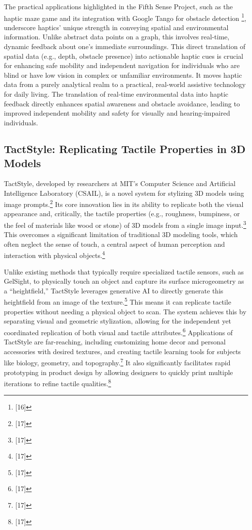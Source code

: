 The practical applications highlighted in the Fifth Sense Project, such as the haptic maze game and its integration with Google Tango for obstacle detection \footnote{[16]}, underscore haptics' unique strength in conveying spatial and environmental information. Unlike abstract data points on a graph, this involves real-time, dynamic feedback about one's immediate surroundings. This direct translation of spatial data (e.g., depth, obstacle presence) into actionable haptic cues is crucial for enhancing safe mobility and independent navigation for individuals who are blind or have low vision in complex or unfamiliar environments. It moves haptic data from a purely analytical realm to a practical, real-world assistive technology for daily living. The translation of real-time environmental data into haptic feedback directly enhances spatial awareness and obstacle avoidance, leading to improved independent mobility and safety for visually and hearing-impaired individuals.

\subsection{TactStyle: Replicating Tactile Properties in 3D Models}
TactStyle, developed by researchers at MIT’s Computer Science and Artificial Intelligence Laboratory (CSAIL), is a novel system for stylizing 3D models using image prompts.\footnote{[17]} Its core innovation lies in its ability to replicate both the visual appearance and, critically, the tactile properties (e.g., roughness, bumpiness, or the feel of materials like wood or stone) of 3D models from a single image input.\footnote{[17]} This overcomes a significant limitation of traditional 3D modeling tools, which often neglect the sense of touch, a central aspect of human perception and interaction with physical objects.\footnote{[17]}

Unlike existing methods that typically require specialized tactile sensors, such as GelSight, to physically touch an object and capture its surface microgeometry as a ``heightfield,'' TactStyle leverages generative AI to directly generate this heightfield from an image of the texture.\footnote{[17]} This means it can replicate tactile properties without needing a physical object to scan. The system achieves this by separating visual and geometric stylization, allowing for the independent yet coordinated replication of both visual and tactile attributes.\footnote{[17]} Applications of TactStyle are far-reaching, including customizing home decor and personal accessories with desired textures, and creating tactile learning tools for subjects like biology, geometry, and topography.\footnote{[17]} It also significantly facilitates rapid prototyping in product design by allowing designers to quickly print multiple iterations to refine tactile qualities.\footnote{[17]}

